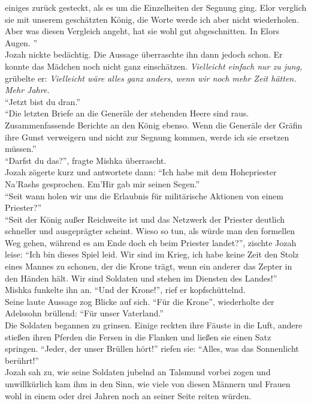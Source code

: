 einiges zurück gesteckt, als es um die Einzelheiten der Segnung ging. Elor verglich sie mit unserem 
geschätzten König, die Worte werde ich aber nicht wiederholen. Aber was diesen Vergleich angeht, 
hat sie wohl gut abgeschnitten. In Elors Augen. ''\\
Jozah nickte bedächtig. Die Aussage überraschte ihn dann jedoch schon. Er konnte das Mädchen noch 
nicht ganz einschätzen. \textit{Vielleicht einfach nur zu jung,} grübelte er: \textit{Vielleicht 
wäre alles ganz anders, wenn wir noch mehr Zeit hätten. Mehr Jahre.}\\
``Jetzt bist du dran.''\\
``Die letzten Briefe an die Generäle der stehenden Heere sind raus. Zusammenfassende Berichte an 
den König ebenso. Wenn die Generäle der Gräfin ihre Gunst verweigern und nicht zur Segnung kommen, 
werde ich sie ersetzen müssen.''\\
``Darfst du das?'', fragte Mishka überrascht.\\
Jozah zögerte kurz und antwortete dann: ``Ich habe mit dem Hohepriester Na'Rashs gesprochen. Em'Hir 
gab mir seinen Segen.''\\
``Seit wann holen wir uns die Erlaubnis für militärische Aktionen von einem 
Priester?''\\
``Seit der König außer Reichweite ist und das Netzwerk der Priester deutlich schneller und 
ausgeprägter scheint. Wieso so tun, als würde man den formellen Weg gehen, während es am Ende doch 
eh beim Priester landet?'', zischte Jozah leise: ``Ich bin dieses Spiel leid. Wir sind im Krieg, 
ich habe keine Zeit den Stolz eines Mannes zu schonen, der die Krone trägt, wenn ein anderer das 
Zepter in den Händen hält. Wir sind Soldaten und stehen im Diensten des Landes!''\\
Mishka funkelte ihn an. ``Und der Krone!'', rief er kopfschüttelnd.\\
Seine laute Aussage zog Blicke auf sich. ``Für die Krone'', wiederholte der Adelssohn brüllend: 
``Für unser Vaterland.''\\
Die Soldaten begannen zu grinsen. Einige reckten ihre Fäuste in die Luft, andere stießen ihren 
Pferden die Fersen in die Flanken und ließen sie einen Satz springen. ``Jeder, der unser Brüllen 
hört!'' riefen sie: ``Alles, was das Sonnenlicht berührt!''\\
Jozah sah zu, wie seine Soldaten jubelnd an Talsmund vorbei zogen und unwillkürlich kam ihm in den 
Sinn, wie viele von diesen Männern und Frauen wohl in einem oder drei Jahren noch an seiner Seite 
reiten würden.\\

